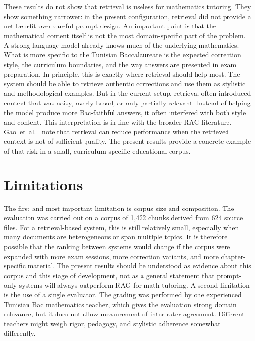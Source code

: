 These results do not show that retrieval is useless for mathematics
tutoring. They show something narrower: in the present configuration,
retrieval did not provide a net benefit over careful prompt design.
An important point is that the mathematical content itself is not the most
domain-specific part of the problem. A strong language model already knows
much of the underlying mathematics. What is more specific to the Tunisian
Baccalaureate is the expected correction style, the curriculum boundaries,
and the way answers are presented in exam preparation.
In principle, this is exactly where retrieval should help most. The system
should be able to retrieve authentic corrections and use them as stylistic
and methodological examples. But in the current setup, retrieval often
introduced context that was noisy, overly broad, or only partially relevant.
Instead of helping the model produce more Bac-faithful answers, it often
interfered with both style and content.
This interpretation is in line with the broader RAG literature.
Gao~et~al.~\cite{gao2024rag_survey} note that retrieval can reduce
performance when the retrieved context is not of sufficient quality. The
present results provide a concrete example of that risk in a small,
curriculum-specific educational corpus.

\section{Limitations}
\label{sec:limitations}

The first and most important limitation is corpus size and composition. The
evaluation was carried out on a corpus of 1{,}422 chunks derived from 624
source files. For a retrieval-based system, this is still relatively small,
especially when many documents are heterogeneous or span multiple topics.
It is therefore possible that the ranking between systems would change if
the corpus were expanded with more exam sessions, more correction variants,
and more chapter-specific material. The present results should be understood
as evidence about this corpus and this stage of development, not as a
general statement that prompt-only systems will always outperform RAG for
math tutoring.
A second limitation is the use of a single evaluator. The grading was
performed by one experienced Tunisian Bac mathematics teacher, which gives
the evaluation strong domain relevance, but it does not allow measurement of
inter-rater agreement. Different teachers might weigh rigor, pedagogy, and
stylistic adherence somewhat differently.

